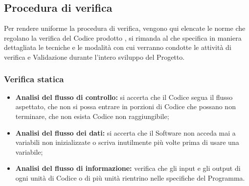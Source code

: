    \subsection{Procedura di verifica}
   Per rendere uniforme la procedura di verifica, vengono qui elencate le norme che regolano la verifica del Codice prodotto , si rimanda al \href{run:../../Esterni/\fPianoDiQualifica}{\fEscapePianoDiQualifica} che specifica in maniera dettagliata le tecniche e le modalità con cui verranno condotte le attività di verifica e Validazione durante l’intero sviluppo del Progetto.
   
   \subsubsection{Verifica statica}
   \begin{itemize}
   
   \item \textbf{Analisi del flusso di controllo:} si accerta che il Codice segua il flusso aspettato, che non si possa entrare in porzioni di Codice che possano non
   terminare, che non esista Codice non raggiungibile;
   \item \textbf{Analisi del flusso dei dati:} si accerta che il Software non acceda mai a variabili non inizializzate o scriva inutilmente più volte prima di usare una variabile;
   \item \textbf{Analisi del flusso di informazione:} verifica che gli input e gli output di ogni unità di Codice o di più unità rientrino nelle specifiche del Programma.
   
  
   \end{itemize}
   
